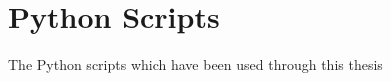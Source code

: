 \chapter{Python Scripts}\label{App:code}
The Python scripts which have been used through this thesis                                                                                                                                                                                                                                                                         
